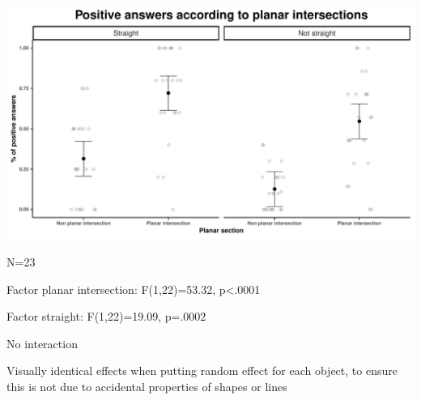 \documentclass[11pt]{beamer}
\begin{document}
        \begin{frame}

          \begin{centering}

          \includegraphics[scale=0.4]{group_straight.pdf}

          \end{centering}

          
          \footnotesize{N=23}
          
            Factor planar intersection: F(1,22)=53.32, p<.0001

          Factor straight: F(1,22)=19.09,  p=.0002

          No interaction 
          
        \footnotesize{Visually identical effects when putting random effect for each object, to ensure this is not due to accidental properties of shapes or lines}

        \end{frame}





\end{document}
